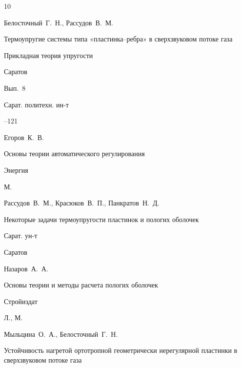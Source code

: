 \begin{thebibliography}{10}

\by Белосточный~Г.~Н., Рассудов~В.~М. 

\paper  Термоупругие системы типа «пластинка–ребра» в сверхзвуковом потоке газа  

\inbook Прикладная теория упругости

\publaddr Саратов

\volinfo Вып.~8

\publ Сарат. политехн. ин-т


--121








\by Егоров~К.~В.  

\book  Основы теории автоматического регулирования


\publ Энергия

\publaddr М.







\by Рассудов~В.~М., Красюков~В.~П., Панкратов~Н.~Д.  

\book  Некоторые задачи термоупругости пластинок и пологих оболочек 


\publ Сарат. ун-т

\publaddr Саратов







\by Назаров~А.~А.

\book Основы теории и методы расчета пологих оболочек


\publ  Стройиздат

\publaddr Л., М.







\by Мыльцина~О.~А., Белосточный~Г.~Н. 

\paper  Устойчивость нагретой ортотропной геометрически нерегулярной пластинки в сверхзвуковом потоке газа 


\end{thebibliography}
